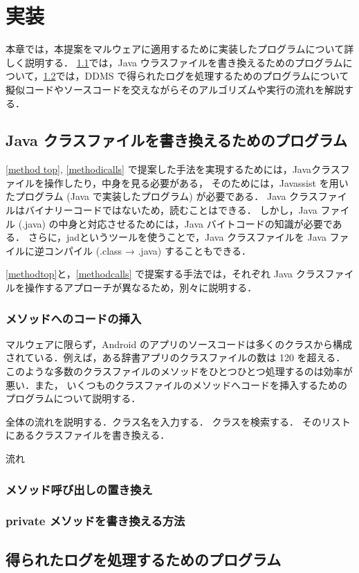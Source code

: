 \section{実装}
\label{sec:instrument}
本章では，本提案をマルウェアに適用するために実装したプログラムについて詳しく説明する．
\ref{programforclass}では，Java ウラスファイルを書き換えるためのプログラムについて，\ref{splitscript}では，DDMS で得られたログを処理するためのプログラムについて擬似コードやソースコードを交えながらそのアルゴリズムや実行の流れを解説する．

\subsection{Java クラスファイルを書き換えるためのプログラム}
\label{programforclass}
\ref{method top}, \ref{methodicalls} で提案した手法を実現するためには，Javaクラスファイルを操作したり，中身を見る必要がある，
そのためには，Javassist\cite{javassist} を用いたプログラム (Java で実装したプログラム) が必要である．
Java クラスファイルはバイナリーコードではないため，読むことはできる．
しかし，Java ファイル (.java) の中身と対応させるためには，Java バイトコードの知識が必要である．
さらに，jad\cite{jad}というツールを使うことで，Java クラスファイルを Java ファイルに逆コンパイル (.class → .java) することもできる．



\ref{methodtop}と，\ref{methodcalls} で提案する手法では，それぞれ Java クラスファイルを操作するアプローチが異なるため，別々に説明する．

\subsubsection{メソッドへのコードの挿入}
マルウェアに限らず，Android のアプリのソースコードは多くのクラスから構成されている．例えば，ある辞書アプリのクラスファイルの数は 120 を超える．このような多数のクラスファイルのメソッドをひとつひとつ処理するのは効率が悪い．また，
いくつものクラスファイルのメソッドへコードを挿入するためのプログラムについて説明する．

全体の流れを説明する．クラス名を入力する．
クラスを検索する．
そのリストにあるクラスファイルを書き換える．
	

流れ

\subsubsection{メソッド呼び出しの置き換え}


\subsubsection{private メソッドを書き換える方法}
\label{private}

\subsection{得られたログを処理するためのプログラム}
\label{splitscript}